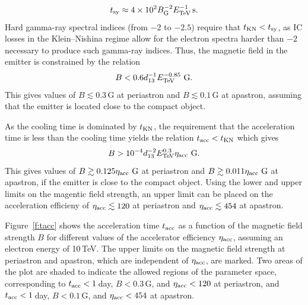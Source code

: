 \documentclass[preprint2]{aastex}
\newcommand{\tev}{\,TeV}
\begin{document}
\begin{equation}
t_{\mbox{\scriptsize{sy}}} \approx 4\times10^2 B_{\mbox{\scriptsize{G}}}^{-2} E_{\mbox{\scriptsize{TeV}}}^{-1} \mbox{\,s}.
\end{equation}
Hard gamma-ray spectral indices (from $-2$ to $-2.5$) require that $t_{\mbox{\scriptsize{KN}}} < t_{\mbox{\scriptsize{sy}}}$, as IC losses in the Klein--Nishina regime allow for the electron spectra harder than $-2$ necessary to produce such gamma-ray indices. Thus, the magnetic field in the emitter is constrained by the relation
\begin{equation}
{B < 0.6 d_{13}^{-1} E_{\mbox{\scriptsize{TeV}}}^{-0.85} \,\mbox{\,G}}.
\end{equation}
This gives values of $B \lesssim 0.3$\,G at periastron and $B \lesssim 0.1$\,G at apastron, assuming that the emitter is located close to the compact object.

As the cooling time is dominated by $t_{\mbox{\scriptsize{KN}}}$, the requirement that the acceleration time is less than the cooling time yields the relation $t_{\mbox{\scriptsize{acc}}} < t_{\mbox{\scriptsize{KN}}}$ which gives
\begin{equation}
B > 10^{-4} d_{13}^{-2} E_{\mbox{\scriptsize{TeV}}}^{0.3} \eta_{\mbox{\scriptsize{acc}}} \,\mbox{\,G}.
\end{equation}
This gives values of $B \gtrsim 0.125 \eta_{\mbox{\scriptsize{acc}}} \,\mbox{\,G}$ at periastron and $B \gtrsim 0.011 \eta_{\mbox{\scriptsize{acc}}} \,\mbox{\,G}$ at apastron, if the emitter is close to the compact object. Using the lower and upper limits on the magentic field strength, an upper limit can be placed on the acceleration efficieny of $\eta_{\mbox{\scriptsize{acc}}} \lesssim 120$ at periastron and $\eta_{\mbox{\scriptsize{acc}}} \lesssim 454$ at apastron.

Figure~\ref{f:tacc} shows the acceleration time $t_{\mbox{\scriptsize{acc}}}$ as a function of the magnetic field strength $B$ for different values of the accelerator efficiency $\eta_{\mbox{\scriptsize{acc}}}$, assuming an electron energy of 10\tev{}. The upper limits on the magnetic field strength at periastron and apastron, which are independent of $\eta_{\mbox{\scriptsize{acc}}}$, are marked. Two areas of the plot are shaded to indicate the allowed regions of the parameter space, corresponding to $t_{\mbox{\scriptsize{acc}}} < 1$\,day, $B < 0.3$\,G, and $\eta_{\mbox{\scriptsize{acc}}} < 120$ at periastron, and $t_{\mbox{\scriptsize{acc}}} < 1$\,day, $B < 0.1$\,G, and $\eta_{\mbox{\scriptsize{acc}}} < 454$ at apastron.
\end{document}
